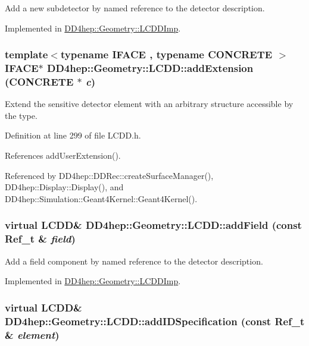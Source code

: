 Add a new subdetector by named reference to the detector description. 

Implemented in \hyperlink{class_d_d4hep_1_1_geometry_1_1_l_c_d_d_imp_ad0926dfc64d99cddfdec4990829d3622}{DD4hep::Geometry::LCDDImp}.\hypertarget{class_d_d4hep_1_1_geometry_1_1_l_c_d_d_a48b0708471772f0a63461840319e12ed}{
\subsubsection[{addExtension}]{\setlength{\rightskip}{0pt plus 5cm}template$<$typename IFACE , typename CONCRETE $>$ IFACE$\ast$ DD4hep::Geometry::LCDD::addExtension (CONCRETE $\ast$ {\em c})}}
\label{class_d_d4hep_1_1_geometry_1_1_l_c_d_d_a48b0708471772f0a63461840319e12ed}


Extend the sensitive detector element with an arbitrary structure accessible by the type. 

Definition at line 299 of file LCDD.h.

References addUserExtension().

Referenced by DD4hep::DDRec::createSurfaceManager(), DD4hep::Display::Display(), and DD4hep::Simulation::Geant4Kernel::Geant4Kernel().\hypertarget{class_d_d4hep_1_1_geometry_1_1_l_c_d_d_a91ae6cfee73a663c46f296bc403b5c63}{
\subsubsection[{addField}]{\setlength{\rightskip}{0pt plus 5cm}virtual {\bf LCDD}\& DD4hep::Geometry::LCDD::addField (const {\bf Ref\_\-t} \& {\em field})}}
\label{class_d_d4hep_1_1_geometry_1_1_l_c_d_d_a91ae6cfee73a663c46f296bc403b5c63}


Add a field component by named reference to the detector description. 

Implemented in \hyperlink{class_d_d4hep_1_1_geometry_1_1_l_c_d_d_imp_a94f5aafcc5fc95d0b15feb960f244019}{DD4hep::Geometry::LCDDImp}.\hypertarget{class_d_d4hep_1_1_geometry_1_1_l_c_d_d_a93f80b4976e72a8a64d73baa6cf50a4d}{
\subsubsection[{addIDSpecification}]{\setlength{\rightskip}{0pt plus 5cm}virtual {\bf LCDD}\& DD4hep::Geometry::LCDD::addIDSpecification (const {\bf Ref\_\-t} \& {\em element})}}
\label{class_d_d4hep_1_1_geometry_1_1_l_c_d_d_a93f80b4976e72a8a64d73baa6cf50a4d}


